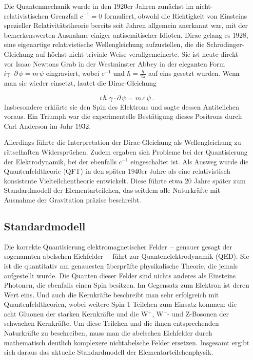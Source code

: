 
\newpage {}
\label{sec:0110}

Die Quantenmechanik wurde in den 1920er Jahren zunächst im nicht-relativistischen Grenzfall $c^{−1}=0$ formuliert, obwohl die Richtigkeit von Einsteins spezieller Relativitätstheorie bereits seit Jahren allgemein anerkannt war, mit der bemerkenswerten Ausnahme einiger antisemitischer Idioten. Dirac gelang es 1928, eine eigenartige relativistische Wellengleichung aufzustellen, die die Schrödinger-Gleichung auf höchst nicht-triviale Weise verallgemeinerte. Sie ist heute direkt vor Isaac Newtons Grab in der Westminster Abbey in der eleganten Form $i \gamma \cdot \partial\, \psi = m\, \psi$ eingraviert, wobei $c^{−1}$ und $\hbar=\frac{h}{2 \pi}$ auf eins gesetzt wurden. Wenn man sie wieder einsetzt, lautet die Dirac-Gleichung

\begin{equation*}
  i\, \hbar\,\, \gamma \cdot \partial\, \psi = m\,c\, \psi\,.
\end{equation*}
%
Insbesondere erklärte sie den Spin des Elektrons und sagte dessen Antiteilchen voraus. Ein Triumph war die experimentelle Bestätigung dieses Positrons durch Carl Anderson im Jahr 1932.

Allerdings führte die Interpretation der Dirac-Gleichung als Wellengleichung zu rätselhaften Widersprüchen. Zudem ergaben sich Probleme bei der Quantisierung der Elektrodynamik, bei der ebenfalls $c^{-1}$ eingeschaltet ist. Als Ausweg wurde die Quantenfeldtheorie (QFT) in den späten 1940er Jahre als eine relativistisch konsistente Vielteilchentheorie entwickelt. Diese führte etwa 20 Jahre später zum Standardmodell der Elementarteilchen, das seitdem alle Naturkräfte mit Ausnahme der Gravitation präzise beschreibt.


\subsection*{Standardmodell}

Die korrekte Quantisierung elektromagnetischer Felder~-- genauer gesagt der sogenannten abelschen Eichfelder~-- führt zur Quantenelektrodynamik (QED). Sie ist die quantitativ am genauesten überprüfte physikalische Theorie, die jemals aufgestellt wurde. Die Quanten dieser Felder sind nichts anderes als Einsteins Photonen, die ebenfalls einen Spin besitzen. Im Gegensatz zum Elektron ist deren Wert eins. Und auch die Kernkräfte beschreibt man sehr erfolgreich mit Quantenfeldtheorien, wobei weitere Spin-1-Teilchen zum Einsatz kommen: die acht Gluonen der starken Kernkräfte und die W$^+$, W$^-$- und Z-Bosonen der schwachen Kernkräfte. Um diese Teilchen und die ihnen entsprechenden Naturkräfte zu beschreiben, muss man die abelschen Eichfelder durch mathematisch deutlich komplexere nichtabelsche Felder ersetzen. Insgesamt ergibt sich daraus das aktuelle Standardmodell der Elementarteilchenphysik.

